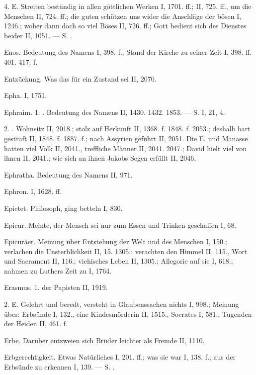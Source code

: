 4.  E. Streiten beständig in allen göttlichen Werken I, 1701. ff.; II, 725. ff., um die Menschen II, 724. ff.; die guten schützen uns wider die Anschläge der bösen I, 1246.; woher dann doch so viel Böses II, 726. ff.; Gott bedient sich des Dienstes beider II, 1051. — S. .

Enos. Bedeutung des Namens I, 398. f.; Stand der Kirche zu seiner Zeit I, 398. ff. 401. 417. f.

Entzückung. Was das für ein Zustand sei II, 2070.

Epha. I, 1751.

Ephraim. 1. . Bedeutung des Namens II, 1430. 1432. 1853. — S.  I, 21,  4.

2. . Wohnsitz II, 2018.; stolz auf Herkunft II, 1368. f. 1848. f. 2053.; deshalb hart gestraft II, 1848. f. 1887. f.; nach Assyrien geführt II,
2051. Die  E. und Manasse hatten viel Volk II, 2041., treffliche Männer II, 2041. 2047.; David hielt viel von ihnen II, 2041.; wie sich an ihnen Jakobs Segen erfüllt II, 2046.

Ephratha. Bedeutung des Namens II, 971.

Ephron. I, 1628. ff.

Epictet. Philosoph, ging betteln I, 830.

Epicur. Meinte, der Mensch sei nur zum Essen und Trinken geschaffen I, 68.

Epicuräer. Meinung über Entstehung der Welt und des Menschen I, 150.; verlachen die Unsterblichkeit II, 15. 1305.; verachten den Himmel II, 115., Wort und Sacrament II, 116.; viehisches Leben II, 1305.; Allegorie auf sie I, 618.; nahmen zu Luthers Zeit zu I, 1764.

Erasmus. 1.  der Papisten II, 1919.

2.  E. Gelehrt und beredt, versteht in Glaubenssachen nichts I, 998.; Meinung über: Erbsünde I, 132., eine Kindesmörderin II, 1515., Socrates I, 581., Tugenden der Heiden II, 461. f.

Erbe. Darüber entzweien sich Brüder leichter als Fremde II, 1110.

Erbgerechtigkeit. Etwas Natürliches I, 201. ff.; was sie war I, 138. f.; aus der Erbsünde zu erkennen I, 139. — S. .

